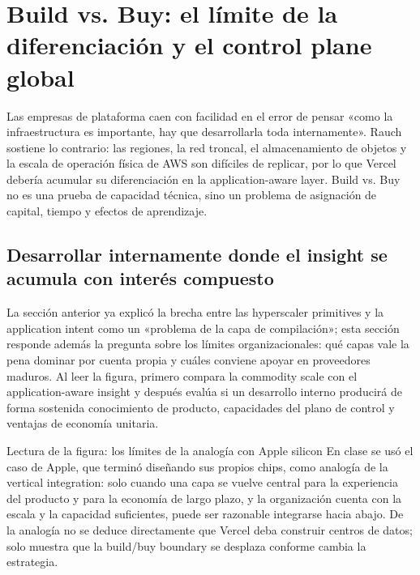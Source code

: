\section{Build vs. Buy: el límite de la diferenciación y el control plane global}

Las empresas de plataforma caen con facilidad en el error de pensar «como la infraestructura es importante, hay que desarrollarla toda internamente». Rauch sostiene lo contrario: las regiones, la red troncal, el almacenamiento de objetos y la escala de operación física de AWS son difíciles de replicar, por lo que Vercel debería acumular su diferenciación en la application-aware layer. Build vs. Buy no es una prueba de capacidad técnica, sino un problema de asignación de capital, tiempo y efectos de aprendizaje.

\subsection{Desarrollar internamente donde el insight se acumula con interés compuesto}

La sección anterior ya explicó la brecha entre las hyperscaler primitives y la application intent como un «problema de la capa de compilación»; esta sección responde además la pregunta sobre los límites organizacionales: qué capas vale la pena dominar por cuenta propia y cuáles conviene apoyar en proveedores maduros. Al leer la figura, primero compara la commodity scale con el application-aware insight y después evalúa si un desarrollo interno producirá de forma sostenida conocimiento de producto, capacidades del plano de control y ventajas de economía unitaria.


\begin{knowledgebox}{Lectura de la figura: los límites de la analogía con Apple silicon}
En clase se usó el caso de Apple, que terminó diseñando sus propios chips, como analogía de la vertical integration: solo cuando una capa se vuelve central para la experiencia del producto y para la economía de largo plazo, y la organización cuenta con la escala y la capacidad suficientes, puede ser razonable integrarse hacia abajo. De la analogía no se deduce directamente que Vercel deba construir centros de datos; solo muestra que la build/buy boundary se desplaza conforme cambia la estrategia.
\end{knowledgebox}

